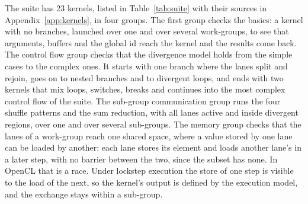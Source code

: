 The suite has 23 kernels, listed in Table~\ref{tab:suite} with their
sources in Appendix~\ref{app:kernels}, in four groups. The first group checks the basics: a kernel with no branches,
launched over one and over several work-groups, to see that arguments,
buffers and the global id reach the kernel and the results come back.
The control flow group checks that the divergence model holds from the
simple cases to the complex ones. It starts with one branch where the 
lanes split and rejoin, goes on to
nested branches and to divergent loops, and ends with two kernels that
mix loops, switches, breaks and continues into the most complex control
flow of the suite. The sub-group
communication group runs the four shuffle patterns and the sum
reduction, with all lanes active and inside divergent regions, over
one and over several sub-groups. The memory group checks that the lanes
of a work-group reach one shared
space, where a value stored by one lane can be loaded by another: each
lane stores its element and loads another lane's in a later step, with
no barrier between the two, since the subset has none. In OpenCL that is
a race. Under lockstep execution the store of one step is visible to the
load of the next, so the kernel's output is defined by the execution
model, and the exchange stays within a sub-group.

